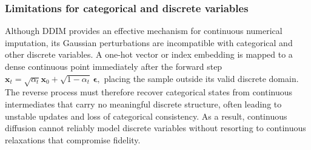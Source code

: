 \documentclass[times, review, 10pt]{elsarticle}
\newcommand{\DIFaddbegin}{\begingroup\color{blue}}
\newcommand{\DIFaddend}{\endgroup}
\begin{document}
\DIFaddbegin
\DIFaddend

\DIFaddbegin
\DIFaddend

\DIFaddbegin
\DIFaddend


\subsubsection{Limitations for categorical and discrete variables}

Although DDIM provides an effective mechanism for continuous numerical
imputation, its Gaussian perturbations are incompatible with categorical and
other discrete variables. A one-hot vector or index embedding is mapped to a
dense continuous point immediately after the forward step
\(
\mathbf{x}_t=\sqrt{\alpha_t}\mathbf{x}_0+\sqrt{1-\alpha_t}\,\boldsymbol{\epsilon},
\)
placing the sample outside its valid discrete domain. The reverse process
must therefore recover categorical states from continuous intermediates that
carry no meaningful discrete structure, often leading to unstable updates
and loss of categorical consistency. As a result, continuous diffusion cannot
reliably model discrete variables without resorting to continuous
relaxations that compromise fidelity.
\end{document}
